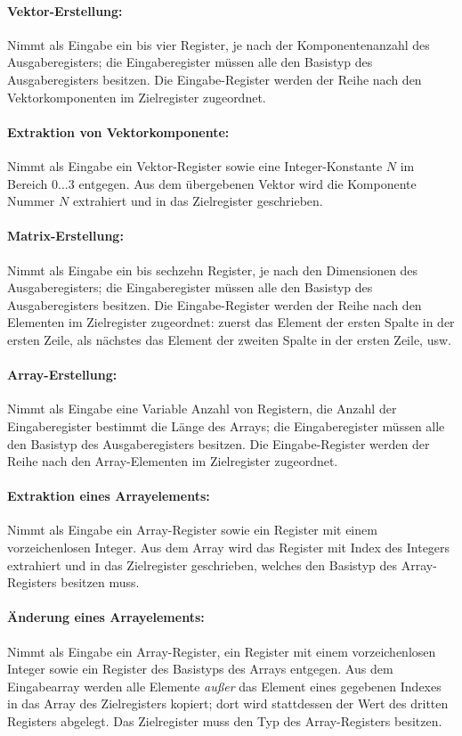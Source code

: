 \documentclass[twoside,a4paper,fleqn,12pt]{article}
\begin{document}
\paragraph{Vektor-Erstellung:} Nimmt als Eingabe ein bis vier Register, je nach der Komponentenanzahl des Ausgaberegisters; die Eingaberegister müssen alle
den Basistyp des Ausgaberegisters besitzen. Die Eingabe-Register werden der Reihe nach den Vektorkomponenten im Zielregister zugeordnet.

\paragraph{Extraktion von Vektorkomponente:} Nimmt als Eingabe ein Vektor-Register sowie eine Integer-Konstante $N$ im Bereich $0 \dots 3$ entgegen.
Aus dem übergebenen Vektor wird die Komponente Nummer $N$ extrahiert und in das Zielregister geschrieben.

\paragraph{Matrix-Erstellung:} Nimmt als Eingabe ein bis sechzehn Register, je nach den Dimensionen des Ausgaberegisters; die Eingaberegister müssen alle
den Basistyp des Ausgaberegisters besitzen. Die Eingabe-Register werden der Reihe nach den Elementen im Zielregister zugeordnet: zuerst das Element der ersten Spalte in der ersten Zeile,
als nächstes das Element der zweiten Spalte in der ersten Zeile, usw.

\paragraph{Array-Erstellung:} Nimmt als Eingabe eine Variable Anzahl von Registern, die Anzahl der Eingaberegister bestimmt die Länge des Arrays; die Eingaberegister müssen alle
den Basistyp des Ausgaberegisters besitzen. Die Eingabe-Register werden der Reihe nach den Array-Elementen im Zielregister zugeordnet.

\paragraph{Extraktion eines Arrayelements:} Nimmt als Eingabe ein Array-Register sowie ein Register mit einem vorzeichenlosen Integer. Aus dem Array wird das Register mit
Index des Integers extrahiert und in das Zielregister geschrieben, welches den Basistyp des Array-Registers besitzen muss.

\paragraph{Änderung eines Arrayelements:} Nimmt als Eingabe ein Array-Register, ein Register mit einem vorzeichenlosen Integer sowie ein Register
des Basistyps des Arrays entgegen. Aus dem Eingabearray werden alle Elemente \emph{außer} das Element eines gegebenen Indexes in das Array des Zielregisters kopiert;
dort wird stattdessen der Wert des dritten Registers abgelegt. Das Zielregister muss den Typ des Array-Registers besitzen.
\end{document}
